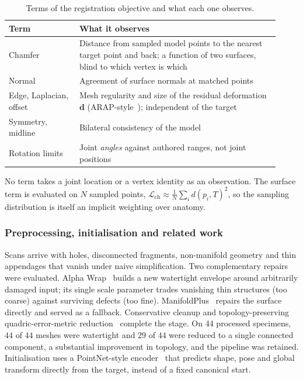 \begin{table}[!htb]
\centering
\caption{Terms of the registration objective and what each one observes.}
\label{tab:objective}
\begin{tabular}{@{}L{0.24\linewidth}L{0.68\linewidth}@{}}
\toprule
\textbf{Term} & \textbf{What it observes}\\
\midrule
Chamfer & Distance from sampled model points to the nearest target point and
 back; a function of two surfaces, blind to which vertex is which\\
Normal & Agreement of surface normals at matched points\\
Edge, Laplacian, offset & Mesh regularity and size of the residual
 deformation $\mathbf d$ (ARAP-style~\cite{arap}); independent of the target\\
Symmetry, midline & Bilateral consistency of the model\\
Rotation limits & Joint \emph{angles} against authored ranges, not joint
 positions\\
\bottomrule
\end{tabular}
\end{table}

No term takes a joint location or a vertex identity as an observation. The
surface term is evaluated on $N$ sampled points,
$\mathcal{L}_{\mathrm{ch}}\approx\frac1N\sum_i d(p_i,T)^2$, so the sampling
distribution is itself an implicit weighting over anatomy.

\subsubsection{Preprocessing, initialisation and related work}

Scans arrive with holes, disconnected fragments, non-manifold geometry and
thin appendages that vanish under naive simplification. Two complementary
repairs were evaluated. Alpha Wrap~\cite{alphawrap} builds a new watertight
envelope around arbitrarily damaged input; its single scale parameter trades
vanishing thin structures (too coarse) against surviving defects (too fine).
ManifoldPlus~\cite{manifoldplus} repairs the surface directly and served as a
fallback. Conservative cleanup and topology-preserving quadric-error-metric
reduction~\cite{qem} complete the stage. On 44 processed specimens, $44$ of
$44$ meshes were watertight and $29$ of $44$ were reduced to a single
connected component, a substantial improvement in topology, and the pipeline
was retained. Initialisation uses a PointNet-style encoder~\cite{pointnet} that
predicts shape, pose and global transform directly from the target, instead of
a fixed canonical start.

